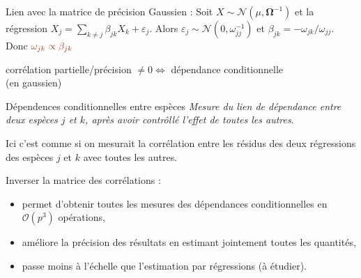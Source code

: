 \documentclass[11pt]{beamer}
\newcommand\Omegab{{\boldsymbol{\Omega}}}
\newcommand{\length}{1.8}
\newcommand{\emphase}[1]{\textcolor{Complement}{#1}}
\newcommand{\bleu}[1]{\textcolor{Framableulight}{#1}}
\newcommand{\Ncal}{\mathcal{N}}
\begin{document}
\begin{frame}{Lien avec la matrice de précision}
\bleu{Gaussien :} Soit   $X\sim \mathcal{N}(\mu, \Omegab^{-1})$ et la régression
$X_j = \sum_{k\neq j} \beta_{jk} X_k + \varepsilon_j$. Alors $\varepsilon_j \sim \Ncal (0, \omega_{jj}^{-1})$ et $ \beta_{jk} = -\omega_{jk}/\omega_{jj}.$
Donc $\emphase{\omega_{jk} \propto \beta_{jk}}$ 
\begin{center}
\bigskip

 corrélation partielle/précision $\neq 0 \iff$ dépendance conditionnelle\\
  (en gaussien)\\
  \end{center}
\end{frame}
\begin{frame}{Dépendences conditionnelles entre espèces}
\textit{Mesure du lien de dépendance entre deux espèces $j$ et $k$, \emphase{après avoir contrôllé l'effet de toutes les autres}}.  \\
 \bigskip
 
  Ici c'est comme si on mesurait la corrélation entre les résidus des deux régressions des espèces $j$ et $k$  avec toutes les autres.\\
 \bigskip
 
  Inverser la matrice des corrélations :
\begin{itemize}
\item  permet d'obtenir toutes les mesures des dépendances conditionnelles en $\mathcal{O}(p^3)$ opérations,
\item améliore la précision des résultats en estimant jointement toutes les quantités,
\item passe moins à l'échelle que l'estimation par régressions (à étudier).
\end{itemize}
\end{frame}
\end{document}
